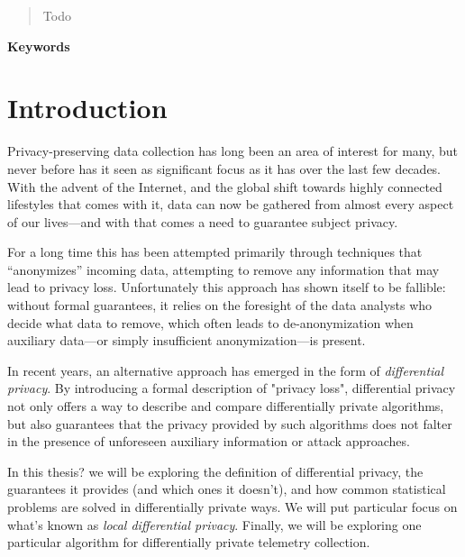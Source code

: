 \documentclass[12pt]{article}
\newcommand{\todo}[1]{{\color{red}#1}}
\begin{document}


\renewcommand{\abstractname}{Abstract}
\begin{abstract}
\todo{Todo}
\end{abstract}

\begin{center} \bf Keywords \end{center}

\thispagestyle{empty}
\tableofcontents
\newpage

\section{Introduction}

Privacy-preserving data collection has long been an area of interest for many, but never before has it seen as significant focus as it has over the last few decades. With the advent of the Internet, and the global shift towards highly connected lifestyles that comes with it, data can now be gathered from almost every aspect of our lives---and with that comes a need to guarantee subject privacy.

For a long time this has been attempted primarily through techniques that ``anonymizes'' incoming data, attempting to remove any information that may lead to privacy loss. Unfortunately this approach has shown itself to be fallible: without formal guarantees, it relies on the foresight of the data analysts who decide what data to remove, which often leads to de-anonymization when auxiliary data---or simply insufficient anonymization---is present.

\bigskip

In recent years, an alternative approach has emerged in the form of \emph{differential privacy}. By introducing a formal description of "privacy loss", differential privacy not only offers a way to describe and compare differentially private algorithms, but also guarantees that the privacy provided by such algorithms does not falter in the presence of unforeseen auxiliary information or attack approaches.

In this \todo{thesis?} we will be exploring the definition of differential privacy, the guarantees it provides (and which ones it doesn't), and how common statistical problems are solved in differentially private ways. We will put particular focus on what's known as \emph{local differential privacy}. Finally, we will be exploring one particular algorithm for differentially private telemetry collection.
\end{document}
